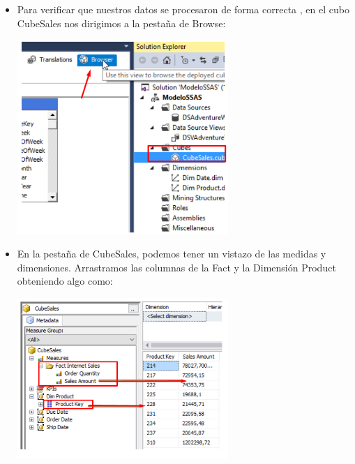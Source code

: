 \begin{itemize}
\begin{center}
	\end{center}	
	 \item Para verificar que nuestros datos se procesaron de forma correcta , en el cubo CubeSales nos dirigimos a la
pestaña de Browse:
	\begin{center}
	\includegraphics[width=8cm]{./Imagenes/img26}
	\end{center}	
	 \item En la pestaña de CubeSales, podemos tener un vistazo de las medidas y dimensiones. Arrastramos las
columnas de la Fact y la Dimensión Product obteniendo algo como:
	\begin{center}
	\includegraphics[width=8cm]{./Imagenes/img27}
	\end{center}	


\end{itemize}
		